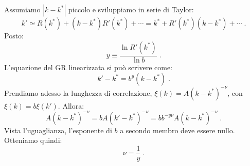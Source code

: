 \documentclass[10pt,a4paper]{report}
\theoremstyle{definition}
\numberwithin{equation}{section}
\begin{document}
Assumiamo $|k-k^*|$ piccolo e sviluppiamo in serie di Taylor:
$$
k'\simeq R(k^*)+(k-k^*)R'(k^*)+\cdots=k^*+R'(k^*)(k-k^*)+\cdots\;.
$$
Posto:
\begin{equation}
y\equiv \frac{\ln R'(k^*)}{\ln b}\;.
\end{equation}
L'equazione del GR linearizzata si può scrivere come:
\begin{equation}
k'-k^*=b^y(k-k^*)\;.
\end{equation}
Prendiamo adesso la lunghezza di correlazione, $\xi(k)=A(k-k^*)^{-\nu}$, con $\xi(k)=b\xi(k')$. Allora:
$$
A(k-k^*)^{-\nu}=bA(k'-k^*)^{-\nu}=bb^{-y\nu}A(k-k^*)^{-\nu}\;.
$$
Vista l'uguaglianza, l'esponente di $b$ a secondo membro deve essere nullo. Otteniamo quindi:
\begin{equation}
\nu=\frac{1}{y}\;.
\end{equation}
\end{document}

